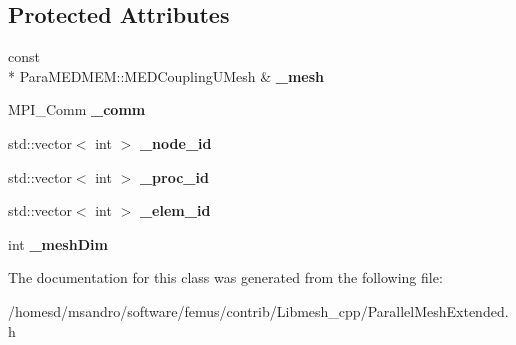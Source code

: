 \subsection*{Protected Attributes}
\begin{DoxyCompactItemize}
\item 
\hypertarget{class_parallel_mesh_extended_aeb9adf72dc239202ddec8b928fdc9c7d}{const \\*
Para\-M\-E\-D\-M\-E\-M\-::\-M\-E\-D\-Coupling\-U\-Mesh \& {\bfseries \-\_\-mesh}}\label{class_parallel_mesh_extended_aeb9adf72dc239202ddec8b928fdc9c7d}

\item 
\hypertarget{class_parallel_mesh_extended_ac8507f7fb4ecede1bd3885c5ba22aa35}{M\-P\-I\-\_\-\-Comm {\bfseries \-\_\-comm}}\label{class_parallel_mesh_extended_ac8507f7fb4ecede1bd3885c5ba22aa35}

\item 
\hypertarget{class_parallel_mesh_extended_ae2c38384c21cc833eaff1f4d64141811}{std\-::vector$<$ int $>$ {\bfseries \-\_\-node\-\_\-id}}\label{class_parallel_mesh_extended_ae2c38384c21cc833eaff1f4d64141811}

\item 
\hypertarget{class_parallel_mesh_extended_a76ebcd5d238e56d2783a4dcd56fd61ff}{std\-::vector$<$ int $>$ {\bfseries \-\_\-proc\-\_\-id}}\label{class_parallel_mesh_extended_a76ebcd5d238e56d2783a4dcd56fd61ff}

\item 
\hypertarget{class_parallel_mesh_extended_aeedaefe4710c9088edb9a9b1672fe6ae}{std\-::vector$<$ int $>$ {\bfseries \-\_\-elem\-\_\-id}}\label{class_parallel_mesh_extended_aeedaefe4710c9088edb9a9b1672fe6ae}

\item 
\hypertarget{class_parallel_mesh_extended_aa9281577930c18e5b2767c361fa4f9fa}{int {\bfseries \-\_\-mesh\-Dim}}\label{class_parallel_mesh_extended_aa9281577930c18e5b2767c361fa4f9fa}

\end{DoxyCompactItemize}


The documentation for this class was generated from the following file\-:\begin{DoxyCompactItemize}
\item 
/homesd/msandro/software/femus/contrib/\-Libmesh\-\_\-cpp/Parallel\-Mesh\-Extended.\-h\end{DoxyCompactItemize}
